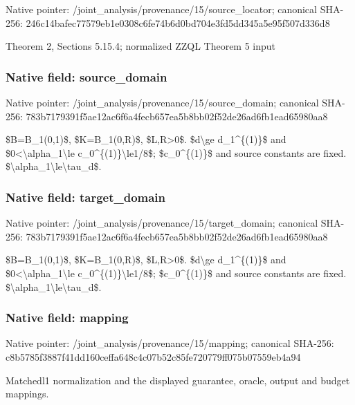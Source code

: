 \documentclass[10pt,a4paper]{article}
\begin{document}
Native pointer: /joint\_analysis/provenan\allowbreak{}ce/15/source\_locator; canonical SHA-256: 246c14bafec77579eb1e0308\allowbreak{}c6fe74b6d0bd704e3fd5dd34\allowbreak{}5a5e95f507d336d8


Theorem 2, Sections 5.15.4; normalized ZZQL Theorem 5 input


\subsubsection{Native field: source\_domain}


Native pointer: /joint\_analysis/provenan\allowbreak{}ce/15/source\_domain; canonical SHA-256: 783b7179391f5ae12ac6f6a4\allowbreak{}fecb657ea5b8bb02f52de26a\allowbreak{}d6fb1ead65980aa8


\$B=B\_1(0,1)\$, \$K=B\_1(0,R)\$, \$L,R>0\$. \$d\textbackslash{}ge d\_1\textasciicircum{}\{(1)\}\$ and \$0<\textbackslash{}alpha\_1\textbackslash{}le c\_0\textasciicircum{}\{(1)\}\textbackslash{}le1/8\$; \$c\_0\textasciicircum{}\{(1)\}\$ and source constants are fixed. \$\textbackslash{}alpha\_1\textbackslash{}le\textbackslash{}tau\_d\$.


\subsubsection{Native field: target\_domain}


Native pointer: /joint\_analysis/provenan\allowbreak{}ce/15/target\_domain; canonical SHA-256: 783b7179391f5ae12ac6f6a4\allowbreak{}fecb657ea5b8bb02f52de26a\allowbreak{}d6fb1ead65980aa8


\$B=B\_1(0,1)\$, \$K=B\_1(0,R)\$, \$L,R>0\$. \$d\textbackslash{}ge d\_1\textasciicircum{}\{(1)\}\$ and \$0<\textbackslash{}alpha\_1\textbackslash{}le c\_0\textasciicircum{}\{(1)\}\textbackslash{}le1/8\$; \$c\_0\textasciicircum{}\{(1)\}\$ and source constants are fixed. \$\textbackslash{}alpha\_1\textbackslash{}le\textbackslash{}tau\_d\$.


\subsubsection{Native field: mapping}


Native pointer: /joint\_analysis/provenance/15/mapping; canonical SHA-256: c8b5785f3887f41dd160ceff\allowbreak{}a648c4c07b52c85fe720779f\allowbreak{}f075b07559eb4a94


Matchedl1 normalization and the displayed guarantee, oracle, output and budget mappings.
\end{document}
